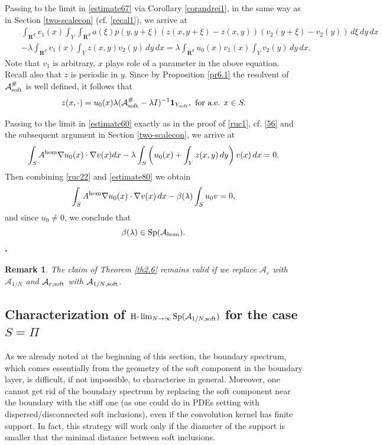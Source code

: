 \documentclass[11pt]{article}
\newcommand\e {\varepsilon}
\newcommand\soft{{\rm soft}}
\newcommand{\R}{\mathbf{R}}
\def\AA{\mathcal{A}}
\def\hom{{\rm hom}}
\DeclareMathOperator{\Sp}{Sp}
\newtheorem{remark}[theorem]{Remark}
\theoremstyle{remark}
\begin{document}
	Passing to the limit in \eqref{estimate67} via   Corollary \ref{corandrei1}, in the same way as in Section \ref{two-scalecon} (cf. \eqref{recal1}), we arrive at
	\begin{eqnarray*} %
		& &\int_{\R^d}v_1(x) \int_{Y} \int_{\R^d} a(\xi)p(y, y+\xi)\left(z(x,y+ \xi)-z(x,y) \right) \left(v_2(y+\xi)-v_2(y)\right)\,d\xi\,dy \,dx \\ & & -\lambda \int_{\R^d} v_1(x)\int_{Y} z(x,y)v_2(y) \,dy\,dx =   \lambda\int_{\R^d}u_0(x) v_1(x)\int_{Y} v_2(y)\, dy \, dx.%
	\end{eqnarray*}
	Note that $v_1$ is arbitrary, $x$ plays role of a parameter in the above equation. Recall also that $z$ is periodic in $y$.
	 Since  by Proposition \ref{pr6.1} the resolvent of $\AA_\soft^\#$ is well defined, it follows that
	\begin{equation} \label{estimate80}
		z(x,\cdot)=u_0(x)\lambda(\AA_\soft^\# -\lambda I)^{-1} \mathbf{1}_{Y_\soft }, \textrm{ for a.e. } x \in S.
	\end{equation}
	
	Passing to the limit in \eqref{estimate60} exactly as in the proof of \eqref{ruc1}, cf. \eqref{56} and the subsequent argument in Section \ref{two-scalecon}, we arrive at
	\begin{equation*}%
		\int_{S}  A^{\rm hom} \nabla u_0(x) \cdot \nabla v(x)  dx - \lambda\int_{S} \left(u_0(x)+\int_{Y} z(x,y)\, dy\right)v(x)\, dx=0.
	\end{equation*}
	Then combining \eqref{ruc22} and \eqref{estimate80}  we obtain
	$$ \int_{S} A^{\rm hom} \nabla u_0(x) \cdot \nabla v(x)\,dx -\beta(\lambda) \int_{S} u_0v=0, $$
	and since $u_0 \neq 0$, we conclude that
 $$
 \beta(\lambda) \in \Sp (\AA_\hom ).
 $$
\hfill $\square$


\begin{remark}
	The claim of  Theorem \ref{th2.6} remains valid if we replace $\AA_\e$ with $\AA_{1/N}$ and $\AA_{\e,\soft}$ with $\AA_{{1/N},\soft}$.
\end{remark} 	





\subsection{Characterization of $\text{H-}\lim_{N \to \infty} \Sp (\AA_{1/N,\rm soft})$ for the case $S=\Pi$} \label{s5.2}

As we already noted at the beginning of this section, the boundary spectrum, which  comes essentially from the geometry of the soft component in the boundary layer, is difficult, if not impossible, to characterise in general. Moreover,  one cannot get rid of the boundary spectrum by replacing the soft component near the boundary with the stiff one (as one could do in PDEs setting with dispersed/disconnected soft inclusions), even if the convolution kernel has finite support. In fact, this strategy will work only if the diameter of the support is smaller that the minimal distance between soft inclusions. 
\end{document}
